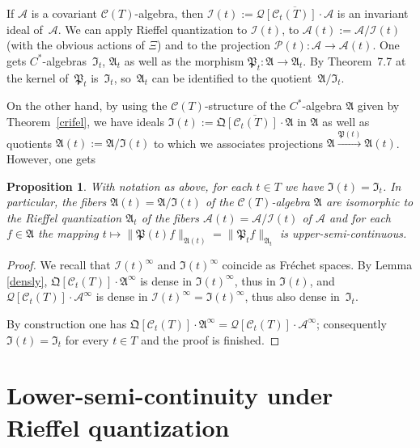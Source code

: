 \documentclass[11pt]{article}
\def\A{{\mathcal A}}
\def\QQ{\mathfrak Q}
\def\AA{\mathfrak A}
\def\C{\mathcal{C}}
\def\Q{\mathcal Q}
\def\PP{{\mathfrak P}}
\newtheorem{Proposition}[Theorem]{Proposition}
{\theoremstyle{definition}
\newtheorem{Definition}[Theorem]{Definition}
\newtheorem{Example}[Theorem]{Example}
\newtheorem{Remark}[Theorem]{Remark}
}
\begin{document}
If $\A$ is a covariant $\C(T)$-algebra, then $\mathcal I(t):=\overline{\Q\left[\C_t(T)\right]\cdot\A}$
is an invariant ideal of~$\A$. We can apply Rief\/fel quantization to
$\mathcal I(t)$, to $\A(t):=\A/\mathcal I(t)$ (with the obvious actions of $\Xi$) and to the projection
$\mathcal P(t):\A\rightarrow\A(t)$. One gets $C^*$-algebras~$\mathfrak I_t$, $\AA_t$ as well as the
morphism $\mathfrak P_t:\AA\rightarrow\AA_t$. By Theorem~7.7 at~\cite{Rie1} the kernel of~$\mathfrak P_t$ is~$\mathfrak I_t$, so~$\AA_t$ can be identif\/ied to the quotient~$\AA/\mathfrak I_t$.

On the other hand, by using the $\C(T)$-structure of the $C^*$-algebra $\AA$ given by Theorem~\ref{crifel}, we have ideals
$\mathfrak I(t):=\overline{\QQ\left[\C_t(T)\right]\cdot\AA}$ in $\AA$ as well as quotients $\AA(t):=\AA/\mathfrak I(t)$
to which we associates projections $\AA\overset{\PP(t)}{\longrightarrow}\AA(t)$.
However, one gets

\begin{Proposition}\label{pieligroasa}
With notation as above, for each $t\in T$ we have $\mathfrak I(t)=\mathfrak I_t$.
In particular, the fibers $\AA(t)=\AA/\mathfrak I(t)$ of  the $\C(T)$-algebra $\AA$ are isomorphic
to the Rieffel quantization $\AA_t$ of the fibers $\A(t)=\A/\mathcal I(t)$ of $\A$ and for each
$f\in\AA$ the mapping $t\mapsto\| \mathfrak P(t)f\|_{\AA(t)}=\| \PP_t f\|_{\AA_t}$
is upper-semi-continuous.
\end{Proposition}

\begin{proof}
We recall that $\mathcal I(t)^\infty$ and $\mathfrak I(t)^\infty$ coincide as Fr\'echet spaces.
By Lemma \ref{densly}, $\QQ\left[\C_t(T)\right]\cdot\AA^\infty$ is dense in $\mathfrak I(t)^\infty$,
thus in $\mathfrak I(t)$, and
$\Q\left[\C_t(T)\right]\cdot\A^\infty$ is dense in $\mathcal I(t)^\infty=\mathfrak I(t)^\infty$,
thus also dense in~$\mathfrak I_t$.

By construction one has $\QQ\left[\C_t(T)\right]\cdot\AA^\infty=\Q\left[\C_t(T)\right]\cdot\A^\infty$;
consequently $\mathfrak I(t)=\mathfrak I_t$ for every $t\in T$ and the proof is f\/inished.
\end{proof}
\setcounter{section}{4}
\setcounter{subsection}{0}
\setcounter{subsubsection}{0}
\setcounter{Theorem}{6}
\setcounter{equation}{4}
\section{Lower-semi-continuity under Rief\/fel quantization}\label{joasa}
\end{document}
